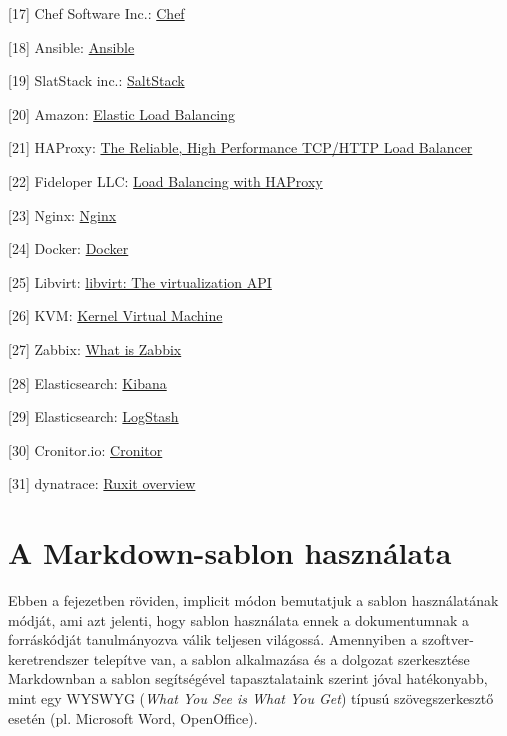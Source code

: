 \documentclass[11pt,magyar,a4paper,oneside,]{report}
\begin{document}
{[}17{]} Chef Software Inc.: \href{https://www.chef.io/chef/}{Chef}

{[}18{]} Ansible: \href{https://www.ansible.com/}{Ansible}

{[}19{]} SlatStack inc.: \href{http://saltstack.com/}{SaltStack}

{[}20{]} Amazon:
\href{https://aws.amazon.com/elasticloadbalancing/}{Elastic Load
Balancing}

{[}21{]} HAProxy: \href{http://www.haproxy.org/}{The Reliable, High
Performance TCP/HTTP Load Balancer}

{[}22{]} Fideloper LLC:
\href{https://serversforhackers.com/load-balancing-with-haproxy}{Load
Balancing with HAProxy}

{[}23{]} Nginx: \href{https://www.nginx.com/}{Nginx}

{[}24{]} Docker: \href{https://www.docker.com/}{Docker}

{[}25{]} Libvirt: \href{https://libvirt.org/}{libvirt: The
virtualization API}

{[}26{]} KVM: \href{http://www.linux-kvm.org/page/Main_Page}{Kernel
Virtual Machine}

{[}27{]} Zabbix: \href{http://www.zabbix.com/product.php}{What is
Zabbix}

{[}28{]} Elasticsearch:
\href{https://www.elastic.co/products/kibana}{Kibana}

{[}29{]} Elasticsearch:
\href{https://www.elastic.co/products/logstash}{LogStash}

{[}30{]} Cronitor.io: \href{https://cronitor.io/}{Cronitor}

{[}31{]} dynatrace:
\href{https://ruxit.com/why-ruxit/overview/\#whyruxitoverview_start}{Ruxit
overview}

\chapter{A Markdown-sablon
használata}\label{a-markdown-sablon-hasznuxe1lata}

Ebben a fejezetben röviden, implicit módon bemutatjuk a sablon
használatának módját, ami azt jelenti, hogy sablon használata ennek a
dokumentumnak a forráskódját tanulmányozva válik teljesen világossá.
Amennyiben a szoftver-keretrendszer telepítve van, a sablon alkalmazása
és a dolgozat szerkesztése Markdownban a sablon segítségével
tapasztalataink szerint jóval hatékonyabb, mint egy WYSWYG (\emph{What
You See is What You Get}) típusú szövegszerkesztő esetén (pl. Microsoft
Word, OpenOffice).
\end{document}
